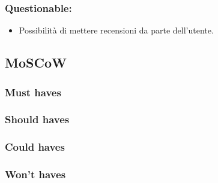 \documentclass{article}
\begin{document}
\subsubsection{Questionable:}
\begin{itemize}
    \item Possibilità di mettere recensioni da parte dell'utente.
\end{itemize}

\subsection{MoSCoW}

\subsubsection{Must haves}
\subsubsection{Should haves}
\subsubsection{Could haves}
\subsubsection{Won't haves}
\end{document}
